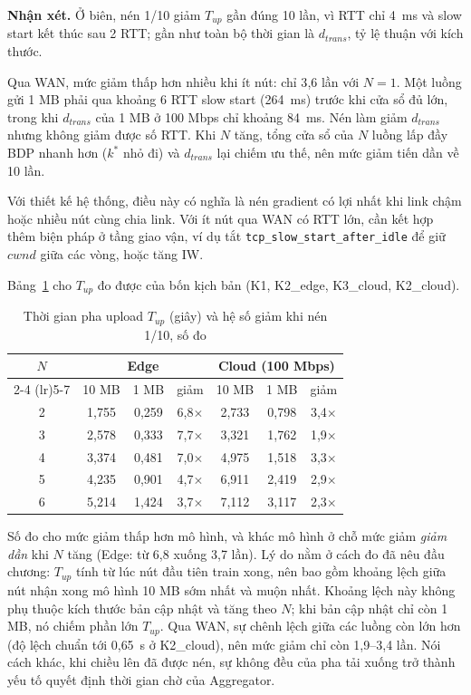 \textbf{Nhận xét.} Ở biên, nén 1/10 giảm $T_{up}$ gần đúng 10 lần, vì RTT chỉ 4~ms và slow start kết thúc sau 2 RTT; gần như toàn bộ thời gian là $d_{trans}$, tỷ lệ thuận với kích thước.

Qua WAN, mức giảm thấp hơn nhiều khi ít nút: chỉ 3{,}6 lần với $N = 1$. Một luồng gửi 1 MB phải qua khoảng 6 RTT slow start (264~ms) trước khi cửa sổ đủ lớn, trong khi $d_{trans}$ của 1 MB ở 100 Mbps chỉ khoảng 84~ms. Nén làm giảm $d_{trans}$ nhưng không giảm được số RTT. Khi $N$ tăng, tổng cửa sổ của $N$ luồng lấp đầy BDP nhanh hơn ($k^{*}$ nhỏ đi) và $d_{trans}$ lại chiếm ưu thế, nên mức giảm tiến dần về 10 lần.

Với thiết kế hệ thống, điều này có nghĩa là nén gradient có lợi nhất khi link chậm hoặc nhiều nút cùng chia link. Với ít nút qua WAN có RTT lớn, cần kết hợp thêm biện pháp ở tầng giao vận, ví dụ tắt \nolinkurl{tcp_slow_start_after_idle} để giữ $cwnd$ giữa các vòng, hoặc tăng IW.

Bảng~\ref{tab:q2meas} cho $T_{up}$ đo được của bốn kịch bản (K1, K2\_edge, K3\_cloud, K2\_cloud).

\begin{table}[H]
    \centering
    \caption{Thời gian pha upload $T_{up}$ (giây) và hệ số giảm khi nén 1/10, số đo}
    \label{tab:q2meas}
    \begin{tabular}{c c c c c c c}
        \toprule
        \multirow{2}{*}{$N$} & \multicolumn{3}{c}{\textbf{Edge}} & \multicolumn{3}{c}{\textbf{Cloud (100 Mbps)}} \\
        \cmidrule(lr){2-4} \cmidrule(lr){5-7}
        & 10 MB & 1 MB & giảm & 10 MB & 1 MB & giảm \\
        \midrule
        2 & 1,755 & 0,259 & 6,8$\times$ & 2,733 & 0,798 & 3,4$\times$ \\
        3 & 2,578 & 0,333 & 7,7$\times$ & 3,321 & 1,762 & 1,9$\times$ \\
        4 & 3,374 & 0,481 & 7,0$\times$ & 4,975 & 1,518 & 3,3$\times$ \\
        5 & 4,235 & 0,901 & 4,7$\times$ & 6,911 & 2,419 & 2,9$\times$ \\
        6 & 5,214 & 1,424 & 3,7$\times$ & 7,112 & 3,117 & 2,3$\times$ \\
        \bottomrule
    \end{tabular}
\end{table}

Số đo cho mức giảm thấp hơn mô hình, và khác mô hình ở chỗ mức giảm \emph{giảm dần} khi $N$ tăng (Edge: từ 6{,}8 xuống 3{,}7 lần). Lý do nằm ở cách đo đã nêu đầu chương: $T_{up}$ tính từ lúc nút đầu tiên train xong, nên bao gồm khoảng lệch giữa nút nhận xong mô hình 10 MB sớm nhất và muộn nhất. Khoảng lệch này không phụ thuộc kích thước bản cập nhật và tăng theo $N$; khi bản cập nhật chỉ còn 1 MB, nó chiếm phần lớn $T_{up}$. Qua WAN, sự chênh lệch giữa các luồng còn lớn hơn (độ lệch chuẩn tới 0{,}65~s ở K2\_cloud), nên mức giảm chỉ còn 1{,}9--3{,}4 lần. Nói cách khác, khi chiều lên đã được nén, sự không đều của pha tải xuống trở thành yếu tố quyết định thời gian chờ của Aggregator.

